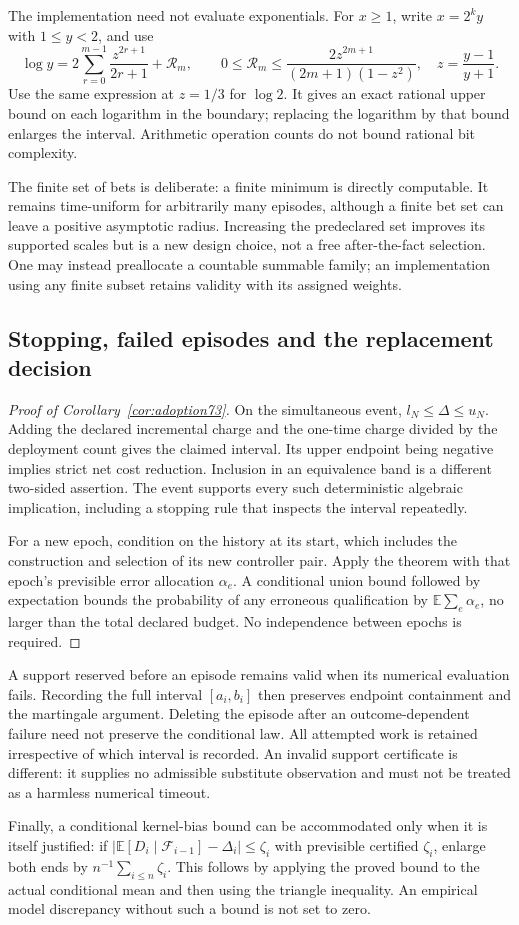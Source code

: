 The implementation need not evaluate exponentials. For $x\ge1$, write $x=2^ky$ with $1\le y<2$, and use
\[
 \log y=2\sum_{r=0}^{m-1}\frac{z^{2r+1}}{2r+1}+\mathcal R_m,
 \qquad 0\le\mathcal R_m\le
       \frac{2z^{2m+1}}{(2m+1)(1-z^2)},\quad z=\frac{y-1}{y+1}.
\]
Use the same expression at $z=1/3$ for $\log2$. It gives an exact rational upper bound on each logarithm in the boundary; replacing the logarithm by that bound enlarges the interval. Arithmetic operation counts do not bound rational bit complexity.

The finite set of bets is deliberate: a finite minimum is directly computable. It remains time-uniform for arbitrarily many episodes, although a finite bet set can leave a positive asymptotic radius. Increasing the predeclared set improves its supported scales but is a new design choice, not a free after-the-fact selection. One may instead preallocate a countable summable family; an implementation using any finite subset retains validity with its assigned weights.

\subsection{Stopping, failed episodes and the replacement decision}\label{supp:adoption73}
\begin{proof}[Proof of Corollary~\ref{cor:adoption73}]
On the simultaneous event, $l_N\le\Delta\le u_N$. Adding the declared incremental charge and the one-time charge divided by the deployment count gives the claimed interval. Its upper endpoint being negative implies strict net cost reduction. Inclusion in an equivalence band is a different two-sided assertion. The event supports every such deterministic algebraic implication, including a stopping rule that inspects the interval repeatedly.

For a new epoch, condition on the history at its start, which includes the construction and selection of its new controller pair. Apply the theorem with that epoch's previsible error allocation $\alpha_e$. A conditional union bound followed by expectation bounds the probability of any erroneous qualification by $\mathbb E\sum_e\alpha_e$, no larger than the total declared budget. No independence between epochs is required.
\end{proof}

A support reserved before an episode remains valid when its numerical evaluation fails. Recording the full interval $[a_i,b_i]$ then preserves endpoint containment and the martingale argument. Deleting the episode after an outcome-dependent failure need not preserve the conditional law. All attempted work is retained irrespective of which interval is recorded. An invalid support certificate is different: it supplies no admissible substitute observation and must not be treated as a harmless numerical timeout.

Finally, a conditional kernel-bias bound can be accommodated only when it is itself justified: if $|\mathbb E[D_i\mid\mathcal F_{i-1}]-\Delta_i|\le\zeta_i$ with previsible certified $\zeta_i$, enlarge both ends by $n^{-1}\sum_{i\le n}\zeta_i$. This follows by applying the proved bound to the actual conditional mean and then using the triangle inequality. An empirical model discrepancy without such a bound is not set to zero.

